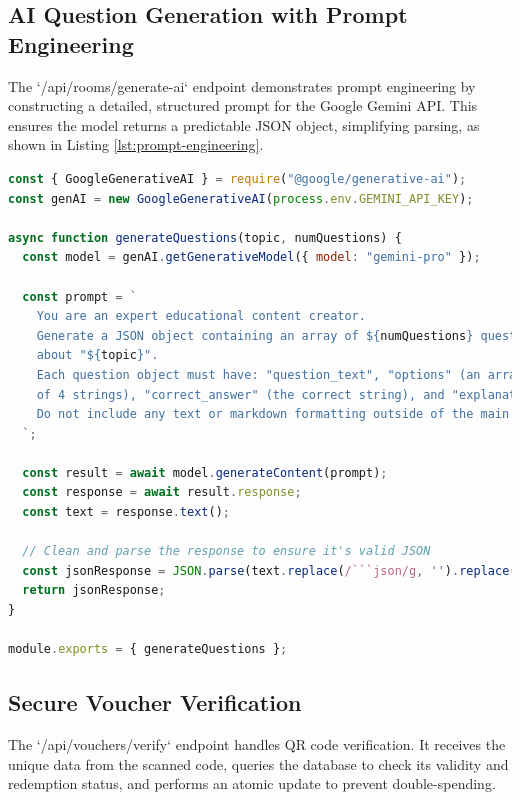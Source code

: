 \subsection{AI Question Generation with Prompt Engineering}
The `/api/rooms/generate-ai` endpoint demonstrates prompt engineering by constructing a detailed, structured prompt for the Google Gemini API. This ensures the model returns a predictable JSON object, simplifying parsing, as shown in Listing \ref{lst:prompt-engineering}.
\FloatBarrier
\begin{lstlisting}[language=JavaScript, caption={Backend service for generating questions via Gemini API with prompt engineering.}, label={lst:prompt-engineering}]
const { GoogleGenerativeAI } = require("@google/generative-ai");
const genAI = new GoogleGenerativeAI(process.env.GEMINI_API_KEY);

async function generateQuestions(topic, numQuestions) {
  const model = genAI.getGenerativeModel({ model: "gemini-pro" });

  const prompt = `
    You are an expert educational content creator.
    Generate a JSON object containing an array of ${numQuestions} questions 
    about "${topic}".
    Each question object must have: "question_text", "options" (an array
    of 4 strings), "correct_answer" (the correct string), and "explanation".
    Do not include any text or markdown formatting outside of the main JSON object.
  `;

  const result = await model.generateContent(prompt);
  const response = await result.response;
  const text = response.text();
  
  // Clean and parse the response to ensure it's valid JSON
  const jsonResponse = JSON.parse(text.replace(/```json/g, '').replace(/```/g, ''));
  return jsonResponse;
}

module.exports = { generateQuestions };
\end{lstlisting}
\FloatBarrier

\subsection{Secure Voucher Verification}
The `/api/vouchers/verify` endpoint handles QR code verification. It receives the unique data from the scanned code, queries the database to check its validity and redemption status, and performs an atomic update to prevent double-spending.

